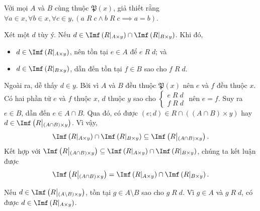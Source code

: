 \resetSubexercise Với mọi $A$ và $B$ cùng thuộc $\mathfrak{P}(x)$, giả thiết rằng $\forall a \in x, \forall b \in x, \forall c \in y, \left(a\;R\;c \land b\;R\;c \implies a = b\right)$.

Xét một $d$ tùy ý. Nếu $d \in \Imf\left(R|_{A \times y}\right) \cap \Imf\left(R\middle|_{B \times y}\right)$. Khi đó, 
\begin{itemize}
   \item $d \in \Imf\left(R\middle|_{A \times y}\right)$, nên tồn tại $e \in A$ để $e\;R\;d$; và
   \item $d \in \Imf\left(R\middle|_{B \times y}\right)$, dẫn đến tồn tại $f \in B$ sao cho $f\;R\;d$. 
\end{itemize}
Ngoài ra, dễ thấy $d \in y$. Bởi vì $A$ và $B$ đều thuộc $\mathfrak{P}(x)$ nên $e$ và $f$ đều thuộc $x$. Có hai phần tử $e$ và $f$ thuộc $x$, $d$ thuộc $y$ sao cho $\begin{cases}
   e\;R\;d \\
   f\;R\;d
\end{cases}$ nên $e = f$. Suy ra $e \in B$, dẫn đến $e \in A \cap B$. Qua đó, có được $(e; d) \in R \cap ((A \cap B) \times y)$ hay $d \in \Imf\left(R\middle|_{(A \cap B) \times y}\right)$. Vì vậy, \begin{equation*}
   \Imf\left(R\middle|_{A \times y}\right) \cap \Imf\left(R\middle|_{B \times y}\right) \subseteq \Imf\left(R\middle|_{(A \cap B) \times y}\right).
\end{equation*}
Kết hợp với $\Imf\left(R\middle|_{(A \cap B) \times y}\right) \subseteq \Imf\left(R\middle|_{A \times y}\right) \cap \Imf\left(R\middle|_{B \times y}\right)$, chúng ta kết luận được \begin{equation*}
   \Imf\left(R\middle|_{(A \cap B) \times y}\right) = \Imf\left(R\middle|_{A \times y}\right) \cap \Imf\left(R\middle|_{B \times y}\right).
\end{equation*}

Nếu $d \in \Imf\left(R\middle|_{(A \setminus B) \times y}\right)$, tồn tại $g \in A \setminus B$ sao cho $g\;R\;d$. Vì $g \in A$ và $g\;R\;d$, có được $d \in \Imf\left(R\middle|_{A \times y}\right)$.

